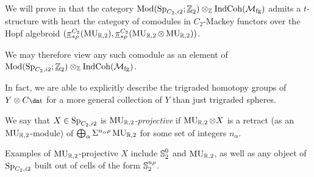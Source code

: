 \begin{rmk}
  We will prove in  that the category $\mathrm{Mod} ( \operatorname{\mathrm{Sp}}_{C_2, i2}; \underline{\mathbb{Z}}_{2}) \otimes_{\mathbb{Z}} \mathrm{IndCoh}(\mathcal{M}_{\mathrm{fg}})$ admits a $t$-structure with heart the category of comodules in $C_2$-Mackey functors over the Hopf algebroid $(\underline{\pi}_{*\rho} ^{C_2} (\operatorname{\mathrm{MU}}_{\mathbb{R},2}), \underline{\pi}_{*\rho}^{C_2} (\operatorname{\mathrm{MU}}_{\mathbb{R}, 2} \otimes \operatorname{\mathrm{MU}}_{\mathbb{R}, 2}))$.
  
  We may therefore view any such comodule as an element of $\mathrm{Mod} ( \operatorname{\mathrm{Sp}}_{C_2, i2}; \underline{\mathbb{Z}}_{2}) \otimes_{\mathbb{Z}} \mathrm{IndCoh}(\mathcal{M}_{\mathrm{fg}})$.
\end{rmk}

In fact, we are able to explicitly describe the trigraded homotopy groups of $Y \otimes C\ta$ for a more general collection of $Y$ than just trigraded spheres.

\begin{dfn}
  We say that $X \in \operatorname{\mathrm{Sp}}_{C_2, i2}$ is \emph{$\operatorname{\mathrm{MU}}_{\mathbb{R},2}$-projective}
  if $\operatorname{\mathrm{MU}}_{\mathbb{R},2} \otimes X$ is a retract (as an $\operatorname{\mathrm{MU}}_{\mathbb{R},2}$-module) of
  $\bigoplus_\alpha \Sigma^{n_\alpha \rho} \operatorname{\mathrm{MU}}_{\mathbb{R},2}$
  for some set of integers $n_\alpha$.
\end{dfn}

Examples of $\operatorname{\mathrm{MU}}_{\mathbb{R},2}$-projective $X$ include $\operatorname{\mathbb{S}}_2 ^0$ and $\operatorname{\mathrm{MU}}_{\mathbb{R},2}$, as well as any object of $\operatorname{\mathrm{Sp}}_{C_2, i2}$ built out of cells of the form $\operatorname{\mathbb{S}}_2^{n\rho}$.

